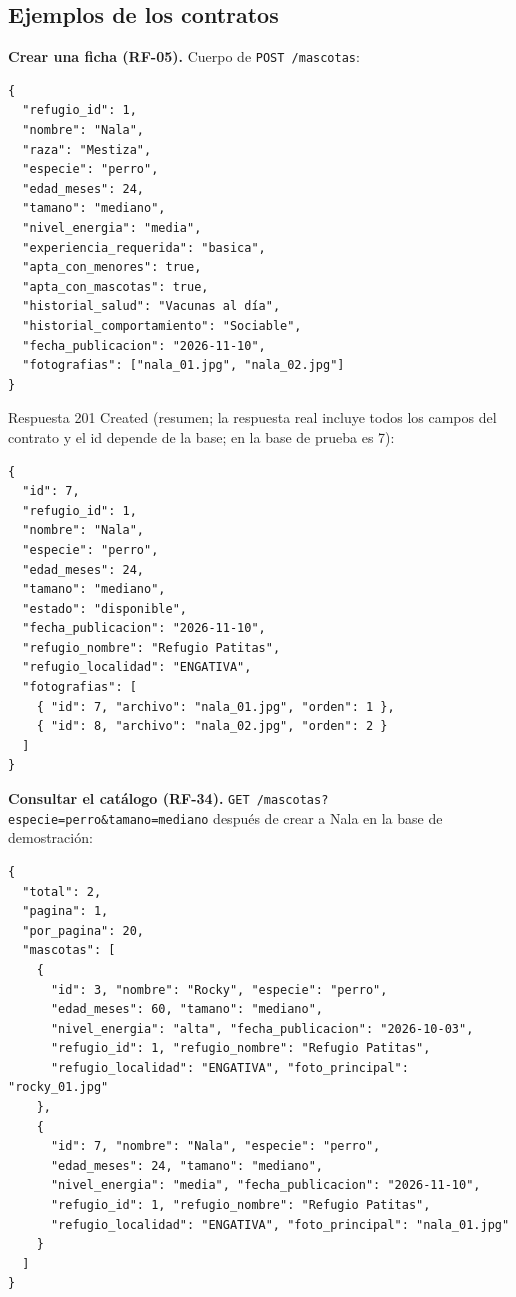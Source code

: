 \documentclass[11pt,a4paper]{article}
\newcommand{\code}[1]{\texttt{#1}}
\begin{document}
\subsection{Ejemplos de los contratos}

\textbf{Crear una ficha (RF-05).} Cuerpo de \code{POST /mascotas}:

\begin{lstlisting}
{
  "refugio_id": 1,
  "nombre": "Nala",
  "raza": "Mestiza",
  "especie": "perro",
  "edad_meses": 24,
  "tamano": "mediano",
  "nivel_energia": "media",
  "experiencia_requerida": "basica",
  "apta_con_menores": true,
  "apta_con_mascotas": true,
  "historial_salud": "Vacunas al día",
  "historial_comportamiento": "Sociable",
  "fecha_publicacion": "2026-11-10",
  "fotografias": ["nala_01.jpg", "nala_02.jpg"]
}
\end{lstlisting}

Respuesta 201 Created (resumen; la respuesta real incluye todos los campos del
contrato y el id depende de la base; en la base de prueba es 7):

\begin{lstlisting}
{
  "id": 7,
  "refugio_id": 1,
  "nombre": "Nala",
  "especie": "perro",
  "edad_meses": 24,
  "tamano": "mediano",
  "estado": "disponible",
  "fecha_publicacion": "2026-11-10",
  "refugio_nombre": "Refugio Patitas",
  "refugio_localidad": "ENGATIVA",
  "fotografias": [
    { "id": 7, "archivo": "nala_01.jpg", "orden": 1 },
    { "id": 8, "archivo": "nala_02.jpg", "orden": 2 }
  ]
}
\end{lstlisting}

\textbf{Consultar el catálogo (RF-34).} \code{GET /mascotas?especie=perro\&tamano=mediano}
después de crear a Nala en la base de demostración:

\begin{lstlisting}
{
  "total": 2,
  "pagina": 1,
  "por_pagina": 20,
  "mascotas": [
    {
      "id": 3, "nombre": "Rocky", "especie": "perro",
      "edad_meses": 60, "tamano": "mediano",
      "nivel_energia": "alta", "fecha_publicacion": "2026-10-03",
      "refugio_id": 1, "refugio_nombre": "Refugio Patitas",
      "refugio_localidad": "ENGATIVA", "foto_principal": "rocky_01.jpg"
    },
    {
      "id": 7, "nombre": "Nala", "especie": "perro",
      "edad_meses": 24, "tamano": "mediano",
      "nivel_energia": "media", "fecha_publicacion": "2026-11-10",
      "refugio_id": 1, "refugio_nombre": "Refugio Patitas",
      "refugio_localidad": "ENGATIVA", "foto_principal": "nala_01.jpg"
    }
  ]
}
\end{lstlisting}
\end{document}
